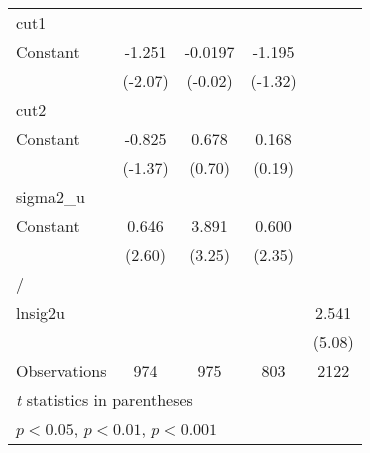 {\begin{tabular}{l*{4}{c}}
\hline
cut1                &                     &                     &                     &                     \\
Constant            &      -1.251\sym{*}  &     -0.0197         &      -1.195         &                     \\
                    &     (-2.07)         &     (-0.02)         &     (-1.32)         &                     \\
\hline
cut2                &                     &                     &                     &                     \\
Constant            &      -0.825         &       0.678         &       0.168         &                     \\
                    &     (-1.37)         &      (0.70)         &      (0.19)         &                     \\
\hline
sigma2\_u            &                     &                     &                     &                     \\
Constant            &       0.646\sym{**} &       3.891\sym{**} &       0.600\sym{*}  &                     \\
                    &      (2.60)         &      (3.25)         &      (2.35)         &                     \\
\hline
/                   &                     &                     &                     &                     \\
lnsig2u             &                     &                     &                     &       2.541\sym{***}\\
                    &                     &                     &                     &      (5.08)         \\
\hline
Observations        &         974         &         975         &         803         &        2122         \\
\hline\hline
\multicolumn{5}{l}{\footnotesize \textit{t} statistics in parentheses}\\
\multicolumn{5}{l}{\footnotesize \sym{*} \(p<0.05\), \sym{**} \(p<0.01\), \sym{***} \(p<0.001\)}\\
\end{tabular}
}
